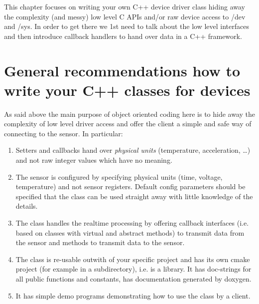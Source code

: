 \documentclass[12pt]{report}
\begin{document}
This chapter focuses on writing your own C++ device driver class
hiding away the complexity (and messy) low level C APIs and/or raw
device access to /dev and /sys. In order to get there we 1st need
to talk about the low level interfaces and then introduce callback
handlers to hand over data in a C++ framework.

\section{General recommendations how to write your C++ classes for devices}
As said above the main purpose of object oriented coding here is to
hide away the complexity of low level driver access and offer the
client a simple and safe way of connecting to the sensor. In
particular:
\begin{enumerate}
\item Setters and callbacks hand over \textsl{physical units}
  (temperature, acceleration, \ldots) and not raw integer values which
  have no meaning.
\item The sensor is configured by specifying physical units (time,
  voltage, temperature) and not sensor registers. Default config parameters
  should be specified that the class can be used straight away
  with little knowledge of the details.
\item The class handles the realtime processing by offering callback
  interfaces (i.e. based on classes with virtual and abstract methods)
  to transmit data from the sensor and methods to transmit data to the sensor.
\item The class is re-usable outwith of your specific project and has
  its own cmake project (for example in a subdirectory), i.e. is a
  library. It has doc-strings for all public functions and constants,
  has documentation generated by doxygen.
\item It has simple demo programs demonstrating how to use the class
  by a client.
\end{enumerate}
\end{document}
